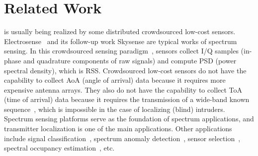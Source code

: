 \section{Related Work}
\label{sec:wowmom-related}
 is usually being realized by some distributed crowdsourced low-cost sensors. 
Electrosense~\cite{electrosense} and its follow-up work Skysense \cite{mobisys20-skysense} are typical works of spectrum sensing.
In this crowdsourced sensing paradigm~\cite{chakraborty2017specsense}, sensors collect I/Q samples (in-phase and quadrature components of raw signals) and compute PSD (power spectral density), which is RSS.
Crowdsourced low-cost sensors do not have the capability to collect AoA (angle of arrival) data because it requires more expensive antenna arrays.
They also do not have the capability to collect ToA (time of arrival) data because it requires the transmission of a wide-band known sequence~\cite{pimrc2021-localize}, which is impossible in the case of localizing (blind) intruders.
Spectrum sensing platforms serve as the foundation of spectrum applications, and transmitter localization is one of the main applications.
Other applications include signal classification~\cite{toccn18-sigclassify}, spectrum anomaly detection~\cite{ben-zhao}, sensor selection~\cite{ton-sensorselect,bhattacharya2022fast}, spectral occupancy estimation~\cite{mobicom21-deepradar}, etc.

